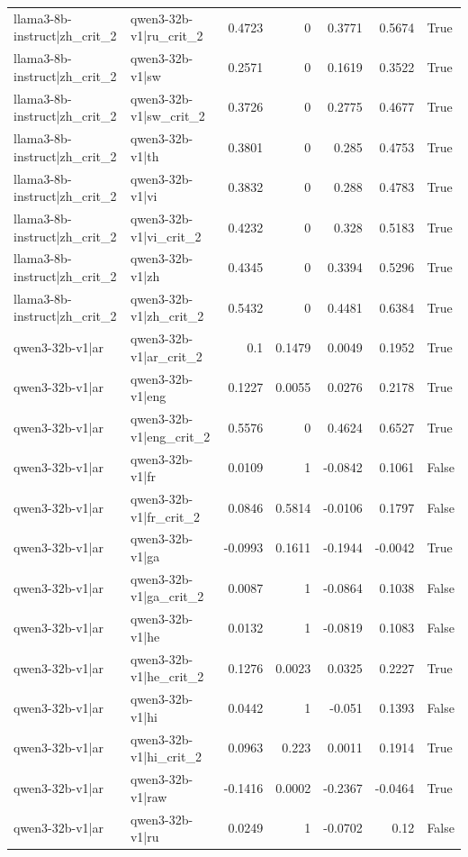 \begin{table}
\begin{tabular}{l l r r r r l}
llama3-8b-instruct|zh_crit_2 & qwen3-32b-v1|ru_crit_2 & 0.4723 & 0 & 0.3771 & 0.5674 & True \\
llama3-8b-instruct|zh_crit_2 & qwen3-32b-v1|sw & 0.2571 & 0 & 0.1619 & 0.3522 & True \\
llama3-8b-instruct|zh_crit_2 & qwen3-32b-v1|sw_crit_2 & 0.3726 & 0 & 0.2775 & 0.4677 & True \\
llama3-8b-instruct|zh_crit_2 & qwen3-32b-v1|th & 0.3801 & 0 & 0.285 & 0.4753 & True \\
llama3-8b-instruct|zh_crit_2 & qwen3-32b-v1|vi & 0.3832 & 0 & 0.288 & 0.4783 & True \\
llama3-8b-instruct|zh_crit_2 & qwen3-32b-v1|vi_crit_2 & 0.4232 & 0 & 0.328 & 0.5183 & True \\
llama3-8b-instruct|zh_crit_2 & qwen3-32b-v1|zh & 0.4345 & 0 & 0.3394 & 0.5296 & True \\
llama3-8b-instruct|zh_crit_2 & qwen3-32b-v1|zh_crit_2 & 0.5432 & 0 & 0.4481 & 0.6384 & True \\
qwen3-32b-v1|ar & qwen3-32b-v1|ar_crit_2 & 0.1 & 0.1479 & 0.0049 & 0.1952 & True \\
qwen3-32b-v1|ar & qwen3-32b-v1|eng & 0.1227 & 0.0055 & 0.0276 & 0.2178 & True \\
qwen3-32b-v1|ar & qwen3-32b-v1|eng_crit_2 & 0.5576 & 0 & 0.4624 & 0.6527 & True \\
qwen3-32b-v1|ar & qwen3-32b-v1|fr & 0.0109 & 1 & -0.0842 & 0.1061 & False \\
qwen3-32b-v1|ar & qwen3-32b-v1|fr_crit_2 & 0.0846 & 0.5814 & -0.0106 & 0.1797 & False \\
qwen3-32b-v1|ar & qwen3-32b-v1|ga & -0.0993 & 0.1611 & -0.1944 & -0.0042 & True \\
qwen3-32b-v1|ar & qwen3-32b-v1|ga_crit_2 & 0.0087 & 1 & -0.0864 & 0.1038 & False \\
qwen3-32b-v1|ar & qwen3-32b-v1|he & 0.0132 & 1 & -0.0819 & 0.1083 & False \\
qwen3-32b-v1|ar & qwen3-32b-v1|he_crit_2 & 0.1276 & 0.0023 & 0.0325 & 0.2227 & True \\
qwen3-32b-v1|ar & qwen3-32b-v1|hi & 0.0442 & 1 & -0.051 & 0.1393 & False \\
qwen3-32b-v1|ar & qwen3-32b-v1|hi_crit_2 & 0.0963 & 0.223 & 0.0011 & 0.1914 & True \\
qwen3-32b-v1|ar & qwen3-32b-v1|raw & -0.1416 & 0.0002 & -0.2367 & -0.0464 & True \\
qwen3-32b-v1|ar & qwen3-32b-v1|ru & 0.0249 & 1 & -0.0702 & 0.12 & False \\

\end{tabular}
\end{table}
